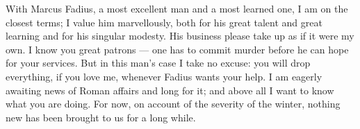 

 With Marcus Fadius, a most excellent man and a most learned one, I am on the closest terms; I value him marvellously, both for his great talent and great learning and for his singular modesty. His business please take up as if it were my own. I know you great patrons --- one has to commit murder before he can hope for your services. But in this man's case I take no excuse: you will drop everything, if you love me, whenever Fadius wants your help. I am eagerly awaiting news of Roman affairs and long for it; and above all I want to know what you are doing. For now, on account of the severity of the winter, nothing new has been brought to us for a long while.
